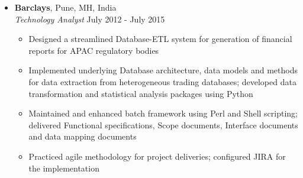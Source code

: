 \documentclass[10pt]{article}
\begin{document}
\begin{itemize}[leftmargin=0.15in]
\begin{itemize}
\end{itemize}

\item  {\bfseries Barclays}, Pune, MH, India \\
{\sl Technology Analyst} \hfill July 2012 - July 2015
\vspace{-0.15cm}
\begin{itemize}
\setlength{\itemsep}{0.2em}%
\item Designed a streamlined Database-ETL system for generation of financial reports for APAC regulatory bodies
\item Implemented underlying Database architecture, data models and methods for data extraction from heterogeneous trading databases; developed data transformation and statistical analysis packages using Python
\item Maintained and enhanced batch framework using Perl and Shell scripting; delivered Functional specifications, Scope documents, Interface documents and data mapping documents
\item Practiced agile methodology for project deliveries; configured JIRA for the implementation
\end{itemize}
\end{itemize}
\end{document}

